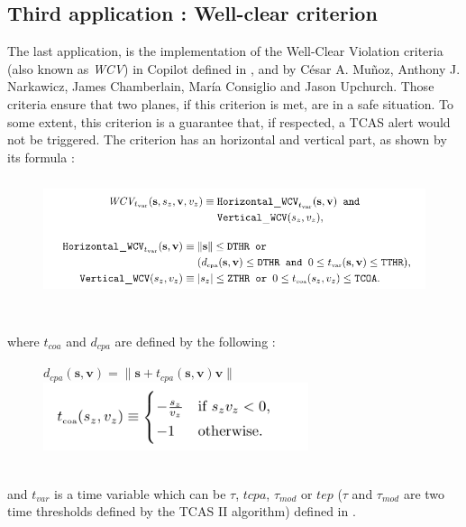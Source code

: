 \documentclass[a4paper,11pt,final]{article}
\begin{document}
	\subsection{Third application : Well-clear criterion}
	The last application, is the implementation of the Well-Clear Violation criteria (also known as \emph{WCV}) in Copilot defined in \cite{WCV1}, \cite{WCV2} and \cite{WCV3} by C\'esar A. Mu\~{n}oz, Anthony J. Narkawicz, James Chamberlain, Mar\'ia Consiglio and Jason Upchurch. Those criteria ensure that two planes, if this criterion is met, are in a safe situation. To some extent, this criterion is a guarantee that, if respected, a TCAS alert would not be triggered. The criterion has an horizontal and vertical part, as shown by its formula : 
	\begin{figure}[!htb]
		\centering
		\includegraphics[height=35mm]{images/WCV/wcv.pdf}\\
	\end{figure}\\
	where $t_{coa}$ and $d_{cpa}$ are defined by the following :
	\begin{figure}[!ht]
		\centering
		$d_{cpa} (\textbf{s},\textbf{v}) = \parallel \textbf{s} + t_{cpa}(\textbf{s}, \textbf{v})\textbf{v} \parallel$\\ \includegraphics[height=20mm]{images/WCV/tcoa.pdf}
	\end{figure}\\
	and $t_{var}$ is a time variable which can be $\tau$, $tcpa$, $\tau_{mod}$ or $tep$ ($\tau$ and $\tau_{mod}$ are two time thresholds defined by the TCAS II algorithm) defined in \cite{WCV1}.
	
\end{document}
